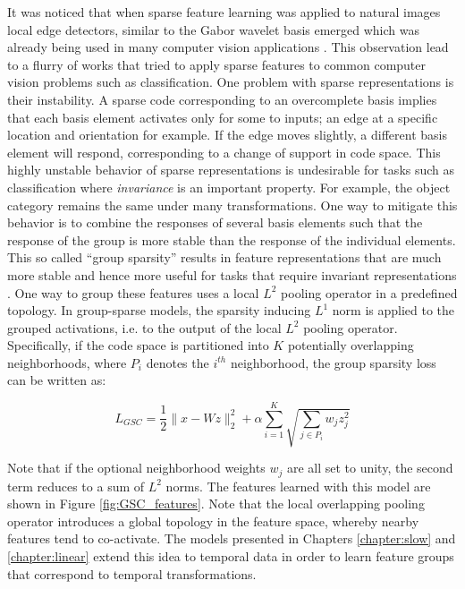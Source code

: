 It was noticed that when sparse feature learning was applied to natural images
local edge detectors, similar to the Gabor wavelet basis emerged which was
already being used in many computer vision applications \cite{SC,gabor}. This
observation lead to a flurry of works that tried to apply sparse features to
common computer vision problems such as classification.  One problem with
sparse representations is their instability.  A sparse code corresponding to an
overcomplete basis implies that each basis element activates only for some to
inputs; an edge at a specific location and orientation for example. If the edge
moves slightly, a different basis element will respond, corresponding to a
change of support in code space. This highly unstable behavior of sparse
representations is undesirable for tasks such as classification where
\emph{invariance} is an important property. For example, the object category
remains the same under many transformations. One way to mitigate this behavior
is to combine the responses of several basis elements such that the response of
the group is more stable than the response of the individual elements.  This so
called ``group sparsity'' results in feature representations that are much more
stable and hence more useful for tasks that require invariant representations
\cite{groupSparsity}. One way to group these features uses a local $L^2$
pooling operator in a predefined topology. In group-sparse models, the sparsity
inducing $L^1$ norm is applied to the grouped activations, i.e. to the output
of the local $L^2$ pooling operator.  Specifically, if the code space is
partitioned into $K$ potentially overlapping neighborhoods, where $P_i$ denotes
the $i^{th}$ neighborhood, the group sparsity loss can be written as: 

\begin{equation} 
L_{GSC} = \frac{1}{2} \|x - Wz \|_2 ^ 2 + \alpha \sum_{i=1} ^ K \sqrt{\sum_{j \in P_i} w_jz_j ^2}  
\label{eqn:gsc_loss} 
\end{equation}

Note that if the optional neighborhood weights $w_j$ are all set to unity, the
second term reduces to a sum of $L^2$ norms.  The features learned with this
model are shown in Figure \ref{fig:GSC_features}.  Note that the local
overlapping pooling operator introduces a global topology in the feature space,
whereby nearby features tend to co-activate. The models presented in Chapters
\ref{chapter:slow} and \ref{chapter:linear} extend this idea to temporal data
in order to learn feature groups that correspond to temporal transformations.    

